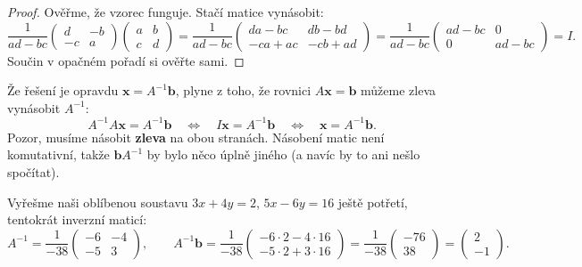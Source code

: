 \begin{proof}
  Ověřme, že vzorec funguje. Stačí matice vynásobit:
  \begin{equation*}
    \frac{1}{ad - bc}\begin{pmatrix} d & -b\\ -c & a \end{pmatrix}\begin{pmatrix} a & b\\ c & d \end{pmatrix}
    = \frac{1}{ad - bc}\begin{pmatrix} da - bc & db - bd\\ -ca + ac & -cb + ad \end{pmatrix}
    = \frac{1}{ad - bc}\begin{pmatrix} ad - bc & 0\\ 0 & ad - bc \end{pmatrix} = I.
  \end{equation*}
  Součin v opačném pořadí si ověřte sami.
\end{proof}

Že řešení je opravdu $\mathbf{x} = A^{-1}\mathbf{b}$, plyne z toho, že rovnici $A\mathbf{x} = \mathbf{b}$ můžeme zleva vynásobit $A^{-1}$:
\begin{equation*}
  A^{-1}A\mathbf{x} = A^{-1}\mathbf{b}\quad\Leftrightarrow\quad I\mathbf{x} = A^{-1}\mathbf{b}\quad\Leftrightarrow\quad \mathbf{x} = A^{-1}\mathbf{b}.
\end{equation*}
Pozor, musíme násobit \textbf{zleva} na obou stranách. Násobení matic není komutativní, takže $\mathbf{b}A^{-1}$ by bylo něco úplně jiného (a navíc by to ani nešlo spočítat).

\begin{example}
  Vyřešme naši oblíbenou soustavu $3x + 4y = 2$, $5x - 6y = 16$ ještě potřetí, tentokrát inverzní maticí:
  \begin{equation*}
    A^{-1} = \frac{1}{-38}\begin{pmatrix} -6 & -4\\ -5 & 3 \end{pmatrix},\qquad
    A^{-1}\mathbf{b} = \frac{1}{-38}\begin{pmatrix} -6\cdot 2 - 4\cdot 16\\ -5\cdot 2 + 3\cdot 16 \end{pmatrix} = \frac{1}{-38}\begin{pmatrix} -76\\ 38 \end{pmatrix} = \begin{pmatrix} 2\\ -1 \end{pmatrix}.
  \end{equation*}
\end{example}


